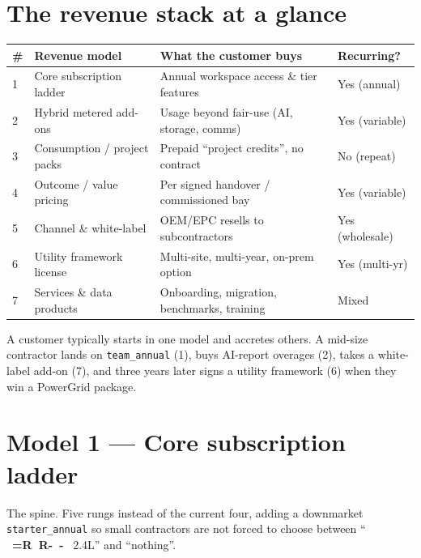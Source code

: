 \documentclass[11pt,a4paper]{article}
\newcommand{\Rs}{%
  \mbox{%
    \sffamily\bfseries
    \setbox0=\hbox{R}%
    R\kern-\wd0
    \raisebox{0.42em}{\rule{0.55em}{0.07em}}%
    \kern-\wd0
    \raisebox{0.25em}{\rule{0.55em}{0.07em}}%
    \kern\wd0
  }%
}
\newcommand{\plan}[1]{\texttt{\textcolor{accent}{#1}}}
\begin{document}
\section{The revenue stack at a glance}

\begin{center}
\begin{tabular}{@{}C{0.5cm} L{3.9cm} L{5.7cm} L{3.5cm}@{}}
  \toprule
  \textbf{\#} & \textbf{Revenue model} & \textbf{What the customer buys} & \textbf{Recurring?} \\
   & Core subscription ladder   & Annual workspace access \& tier features      & Yes (annual) \\
  2 & Hybrid metered add-ons     & Usage beyond fair-use (AI, storage, comms)    & Yes (variable) \\
  3 & Consumption / project packs& Prepaid ``project credits'', no contract      & No (repeat) \\
  4 & Outcome / value pricing    & Per signed handover / commissioned bay        & Yes (variable) \\
  5 & Channel \& white-label     & OEM/EPC resells to subcontractors             & Yes (wholesale) \\
  6 & Utility framework license  & Multi-site, multi-year, on-prem option        & Yes (multi-yr) \\
  7 & Services \& data products  & Onboarding, migration, benchmarks, training   & Mixed \\
  \bottomrule
\end{tabular}
\end{center}

\noindent A customer typically starts in one model and accretes others. A mid-size
contractor lands on \plan{team\_annual} (1), buys AI-report overages (2), takes a
white-label add-on (7), and three years later signs a utility framework (6) when
they win a PowerGrid package.

\section{Model 1 --- Core subscription ladder}

The spine. Five rungs instead of the current four, adding a downmarket
\plan{starter\_annual} so small contractors are not forced to choose between
``\Rs 2.4L'' and ``nothing''.
\end{document}
